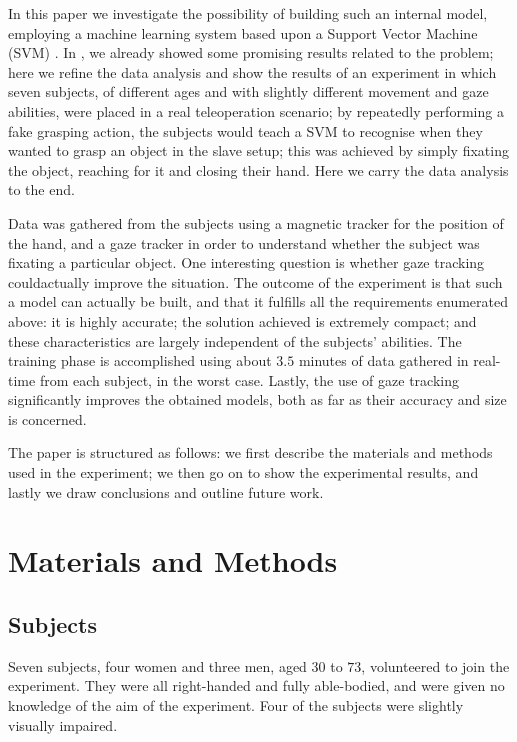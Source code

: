 \documentclass[jou,a4paper,notxfonts]{apa}
\begin{document}
In this paper we investigate the possibility of building such an
internal model, employing a machine learning system based upon a
Support Vector Machine (SVM) \cite{BGV92}. In \cite{clea07}, we
already showed some promising results related to the problem; here we
refine the data analysis and show the results of an experiment in
which seven subjects, of different ages and with slightly different
movement and gaze abilities, were placed in a real teleoperation
scenario; by repeatedly performing a fake grasping action, the
subjects would teach a SVM to recognise when they wanted to grasp an
object in the slave setup; this was achieved by simply fixating the
object, reaching for it and closing their hand. Here we carry the data
analysis to the end.

Data was gathered from the subjects using a magnetic tracker for the
position of the hand, and a gaze tracker in order to understand
whether the subject was fixating a particular object. One interesting
question is whether gaze tracking couldactually improve the situation.
The outcome of the experiment is that such a model can actually be
built, and that it fulfills all the requirements enumerated above: it
is highly accurate; the solution achieved is extremely compact; and
these characteristics are largely independent of the subjects'
abilities. The training phase is accomplished using about $3.5$
minutes of data gathered in real-time from each subject, in the worst
case. Lastly, the use of gaze tracking significantly improves the
obtained models, both as far as their accuracy and size is concerned.

The paper is structured as follows: we first describe the materials
and methods used in the experiment; we then go on to show the
experimental results, and lastly we draw conclusions and outline
future work.

\section{Materials and Methods}

\label{sec:matmet}

\subsection{Subjects}

Seven subjects, four women and three men, aged $30$ to $73$,
volunteered to join the experiment. They were all right-handed and
fully able-bodied, and were given no knowledge of the aim of the
experiment. Four of the subjects were slightly visually
impaired.
\end{document}

